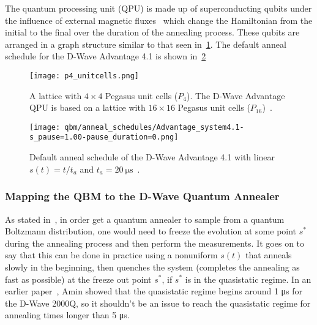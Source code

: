 The quantum processing unit (QPU) is made up of superconducting qubits under the influence of external magnetic fluxes~\cite{qc_lecture_notes} which change the Hamiltonian from the initial to the final over the duration of the annealing process.
These qubits are arranged in a graph structure similar to that seen in~\cref{fig:p4_unitcells}.
The default anneal schedule for the D-Wave Advantage 4.1 is shown in~\cref{fig:anneal_schedule_default}
\begin{figure}[!htb]
    \begin{center}
        \texttt{[image: p4\_unitcells.png]}
    \end{center}
    \caption{
        A lattice with \( 4 \times 4 \) Pegasus unit cells (\( P_4 \)).
        The D-Wave Advantage QPU is based on a lattice with \( 16 \times 16 \) Pegasus unit cells (\( P_{16} \))~\cite{dwave_topologies}.
    }
    \label{fig:p4_unitcells}
\end{figure}
\begin{figure}[!htb]
    \begin{center}
        \texttt{[image: qbm/anneal\_schedules/Advantage\_system4.1-s\_pause=1.00-pause\_duration=0.png]}
    \end{center}
    \caption{
        Default anneal schedule of the D-Wave Advantage 4.1 with linear \( s(t) = t / t_a \) and \( t_a = 20 \ \si{\micro\second} \)~\cite{dwave_anneal_schedules}.
    }
    \label{fig:anneal_schedule_default}
\end{figure}

\subsubsection{Mapping the QBM to the D-Wave Quantum Annealer}
As stated in~\cite{amin_2018}, in order get a quantum annealer to sample from a quantum Boltzmann distribution, one would need to freeze the evolution at some point \( s^* \) during the annealing process and then perform the measurements.
It goes on to say that this can be done in practice using a nonuniform \( s(t) \) that anneals slowly in the beginning, then quenches the system (completes the annealing as fast as possible) at the freeze out point \( s^* \), if \( s^* \) is in the quasistatic regime.
In an earlier paper~\cite{amin_2015}, Amin showed that the quasistatic regime begins around 1 \si{\micro\second} for the D-Wave 2000Q, so it shouldn't be an issue to reach the quasistatic regime for annealing times longer than 5 \si{\micro\second}.

